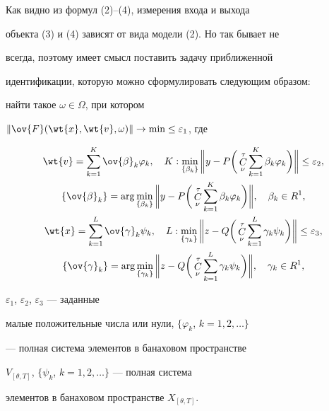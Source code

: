 Как видно из формул (2)--(4), измерения входа и выхода


объекта (3) и (4) зависят от вида модели (2). Но так бывает не


всегда, поэтому имеет смысл поставить задачу приближенной


идентификации, которую можно сформулировать следующим образом:


{\it


найти такое $\omega\in\Omega$, при котором


$\|\ov{F}(\wt{x},\wt{v},\omega)\|\to


\min\leq\varepsilon_1$, где


\begin{gather*}


\wt{v}=\sum^K_{k=1}\ov{\beta}_k\varphi_k, \quad


K:\min_{\{\beta_k\}}\bigg\|y-P\bigg (\Cu^\tau_\nu


\sum^K_{k=1}\beta_k\varphi_k\bigg


)\bigg\|\leq\varepsilon_2,\\


%


\{\ov{\beta}_k\}=\arg\min_{\{\beta_k\}}\bigg\|y-P\bigg(


\Cu^\tau_\nu \sum\limits^K_{k=1}\beta_k\varphi_k\bigg


)\bigg\|,\quad \beta_k\in R^1, \\


%


\wt{x}= \sum\limits^L_{k=1}\ov{\gamma}_k\psi_k,\quad


L:\min\limits_{\{\gamma_k\}}\bigg\|z-Q\bigg(\Cu^\tau_\nu


\sum\limits^L_{k=1}\gamma_k\psi_k\bigg


)\bigg\|\leq\varepsilon_3,\\


%


\{\ov{\gamma}_k\}= \arg\min\limits_{\{\gamma_k\}}\bigg\|z-Q\bigg


(\Cu^\tau_\nu \sum\limits^L_{k=1}\gamma_k\psi_k\bigg


)\bigg\|,\quad \gamma_k\in R^1,


\end{gather*}


$\varepsilon_1$, $\varepsilon_2$, $\varepsilon_3$ --- заданные


малые положительные числа или нули, $\{\varphi_k$, $k=1,2,\dotsc\}$


--- полная система элементов в банаховом пространстве


$V_{[\theta,T]}$, $\{\psi_k$, $k=1,2,\dotsc\}$ --- полная система


элементов в банаховом пространстве $X_{[\theta,T]}$.


}






